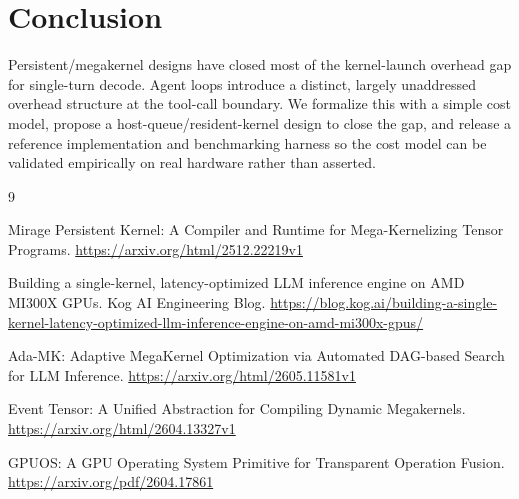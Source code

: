 \documentclass{article}
\begin{document}
\section{Conclusion}

Persistent/megakernel designs have closed most of the kernel-launch
overhead gap for single-turn decode. Agent loops introduce a
distinct, largely unaddressed overhead structure at the tool-call
boundary. We formalize this with a simple cost model, propose a
host-queue/resident-kernel design to close the gap, and release a
reference implementation and benchmarking harness so the cost model
can be validated empirically on real hardware rather than asserted.

\begin{thebibliography}{9}

Mirage Persistent Kernel: A Compiler and Runtime for Mega-Kernelizing
Tensor Programs. \url{https://arxiv.org/html/2512.22219v1}

Building a single-kernel, latency-optimized LLM inference engine on
AMD MI300X GPUs. Kog AI Engineering Blog.
\url{https://blog.kog.ai/building-a-single-kernel-latency-optimized-llm-inference-engine-on-amd-mi300x-gpus/}

Ada-MK: Adaptive MegaKernel Optimization via Automated DAG-based
Search for LLM Inference. \url{https://arxiv.org/html/2605.11581v1}

Event Tensor: A Unified Abstraction for Compiling Dynamic
Megakernels. \url{https://arxiv.org/html/2604.13327v1}

GPUOS: A GPU Operating System Primitive for Transparent Operation
Fusion. \url{https://arxiv.org/pdf/2604.17861}

\end{thebibliography}
\end{document}
